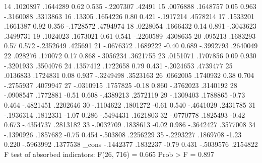          14  {\VBAR}   .1020897   .1644289     0.62   0.535    -.2207307      .42491
         15  {\VBAR}   .0076888   .1648757     0.05   0.963    -.3160088    .3313863
         16  {\VBAR}     .13305   .1654226     0.80   0.421    -.1917214    .4578214
         17  {\VBAR}   .1533201   .1661387     0.92   0.356    -.1728572    .4794974
         18  {\VBAR}   .0228054   .1666432     0.14   0.891    -.3043623    .3499731
         19  {\VBAR}   .1024023   .1673021     0.61   0.541    -.2260589    .4308635
         20  {\VBAR}    .095213   .1683293     0.57   0.572    -.2352649     .425691
         21  {\VBAR}  -.0676372   .1689222    -0.40   0.689    -.3992793    .2640049
         22  {\VBAR}    .028276    .170072     0.17   0.868    -.3056234    .3621755
         23  {\VBAR}   .0151071   .1707856     0.09   0.930    -.3201933    .3504076
         24  {\VBAR}   .1357412   .1722658     0.79   0.431    -.2024653    .4739477
         25  {\VBAR}   .0136833   .1724831     0.08   0.937    -.3249498    .3523163
         26  {\VBAR}   .0662005   .1740932     0.38   0.704    -.2755937    .4079947
         27  {\VBAR}  -.0310915   .1757825    -0.18   0.860    -.3762023    .3140192
         28  {\VBAR}  -.0908547   .1772881    -0.51   0.608    -.4389213    .2572119
         29  {\VBAR}  -.1309403   .1788865    -0.73   0.464    -.4821451    .2202646
         30  {\VBAR}  -.1104622   .1801272    -0.61   0.540    -.4641029    .2431785
         31  {\VBAR}  -.1936314   .1812331    -1.07   0.286    -.5494431    .1621803
         32  {\VBAR}  -.0770778   .1825493    -0.42   0.673    -.4354737    .2813182
         33  {\VBAR}  -.0032709   .1838613    -0.02   0.986    -.3642427    .3577008
         34  {\VBAR}  -.1390926   .1857682    -0.75   0.454     -.503808    .2256229
         35  {\VBAR}  -.2293227   .1869708    -1.23   0.220    -.5963992    .1377538
             {\VBAR}
       _cons {\VBAR}  -.1442377   .1832237    -0.79   0.431    -.5039576    .2154822
F test of absorbed indicators: F(26, 716) = 0.665             Prob > F = 0.897
{\smallskip}

